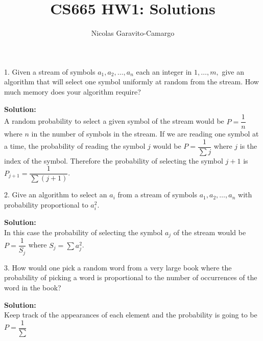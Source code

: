 \documentclass[14pt]{article}
\title{CS665 HW1: Solutions}
\author{Nicolas Garavito-Camargo}
\begin{document}
\maketitle

\begin{mdframed}

1. Given a stream of symbols $a_1,a_2,…,a_n$ each an integer in
$1,…,m,$ give an algorithm that will select one symbol uniformly
 at random from the stream. How much memory does your algorithm require?

\end{mdframed}

\textbf{Solution:}\\

A random probability to select a given symbol of the stream
would be $P = \dfrac{1}{n}$ where $n$ in the number of symbols in the
stream. If we are reading one symbol at a time, the probability of
reading the symbol $j$ would
be $P = \dfrac{1}{\sum j}$ where $j$ is the index of the symbol. Therefore 
the probability of selecting the symbol $j+1$ is $P_{j+1} =
\dfrac{1}{\sum (j+1)}$.\\


\begin{mdframed}
2. Give an algorithm to select an $a_i$ from a stream of symbols
$a_1,a_2,…,a_n$ with probability proportional to $a^2_i$.\\
\end{mdframed}

\textbf{Solution:}\\


In this case the probability of selecting the symbol $a_j$ of the stream 
would be $P = \dfrac{1}{S_{j}}$ where $S_j = \sum a_j^2$.

\begin{mdframed}
3. How would one pick a random word from a very large book where the
probability of picking a word is proportional to the number of
occurrences of the word in the book? \\
\end{mdframed}

\textbf{Solution:}\\

Keep track of the appearances of each element and the probability is
going to be $P = \dfrac{1}{\sum  }$
\end{document}
